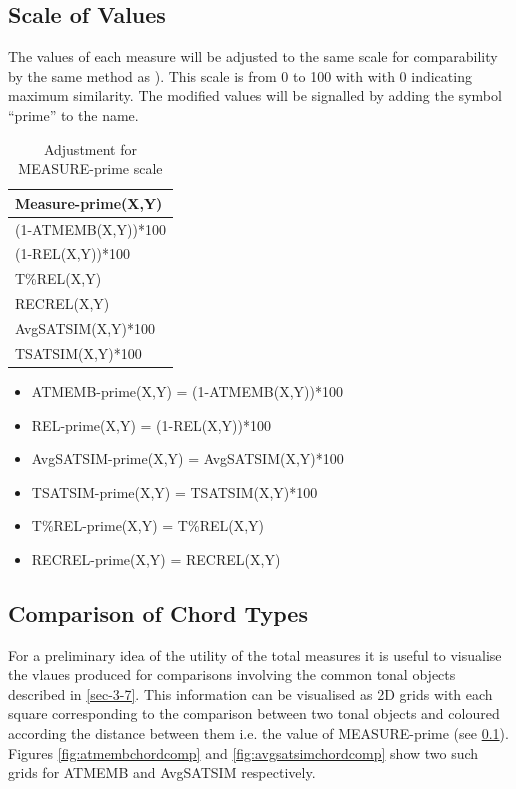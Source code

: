 \documentclass{article}
\begin{document}
\subsection{Scale of Values}
\label{sec-7-6}

The values of each measure will be adjusted to the same scale for
comparability by the same method as \citet[pp. 48]{Kuusi2001}). This
scale is from 0 to 100 with with 0 indicating maximum similarity. The
modified values will be signalled by adding the symbol ``prime'' to the
name.
\begin{table}[htb]
\caption{Adjustment for MEASURE-prime scale} 
\begin{center}
\begin{tabular}{l}
 Measure-prime(X,Y)   \\
\hline
 (1-ATMEMB(X,Y))*100  \\
 (1-REL(X,Y))*100     \\
 T\%REL(X,Y)          \\
 RECREL(X,Y)          \\
 AvgSATSIM(X,Y)*100   \\
 TSATSIM(X,Y)*100     \\
\end{tabular}
\end{center}
\end{table}


\begin{itemize}
\item ATMEMB-prime(X,Y) = (1-ATMEMB(X,Y))*100
\item REL-prime(X,Y) = (1-REL(X,Y))*100
\item AvgSATSIM-prime(X,Y) = AvgSATSIM(X,Y)*100
\item TSATSIM-prime(X,Y) = TSATSIM(X,Y)*100
\item T\%REL-prime(X,Y) = T\%REL(X,Y)
\item RECREL-prime(X,Y) = RECREL(X,Y)
\end{itemize}
\subsection{Comparison of Chord Types}
\label{sec-7-7}

For a preliminary idea of the utility of the total measures it is
useful to visualise the vlaues produced for comparisons involving the
common tonal objects described in \ref{sec-3-7}. This information
can be visualised as 2D grids with each square corresponding to the
comparison between two tonal objects and coloured according the
distance between them i.e. the value of MEASURE-prime (see \ref{sec-7-6}). Figures \ref{fig:atmembchordcomp} and
\ref{fig:avgsatsimchordcomp} show two such grids for ATMEMB and
AvgSATSIM respectively.
\end{document}
